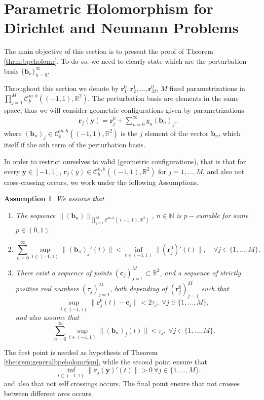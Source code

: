 \documentclass{article}
\newtheorem{assumption}[theorem]{Assumption}
\newcommand{\IN}{{\mathbb N}}
\newcommand{\IR}{{\mathbb R}}
\newcommand{\cmspaceh}[4]{\mathcal{C}^{#1,#2} \left( #3, #4 \right)}
\newcommand{\rgeoh}[2]{\mathcal{C}_b^{#1,#2}\left( (-1,1), \IR^2 \right)}
\newcommand{\bc}{\bm{c}}
\newcommand{\br}{\bm{r}}
\newcommand{\by}{\bm{y}}
\newcommand{\bb}{\bm{b}}
\begin{document}
\section{Parametric Holomorphism for Dirichlet and Neumann Problems}
\label{sec:parametrichlmrf}
The main objective of this section is to present the proof of Theorem \ref{thrm:bpeholomr}. To do so, we need to clearly state which are the perturbation basis $\{\bb_n\}_{n=0}^\infty$.

Throughout this section we denote by 
$\br^0_1,\br^1_2,\hdots, \br^0_M$, $M$ fixed parametrizations in $\prod_{j=1}^M \rgeoh{m}{h}$.  The perturbation basis are elements in the same space, thus we will consider geometric configurations given by parametrizations 
\begin{align*}
\br_j(\by) = \br^0_j + \sum_{n=0}^\infty y_n (\bb_n)_j ,
\end{align*}
where $(\bb_n)_j \in \rgeoh{m}{h}$ is the $j$ element of the vector $\bb_n$, which itself if the $n$th term of the perturbation basis.

In order to restrict ourselves to valid (geometric configurations), that is that for every $\by \in [-1,1]$, $\br_j(y) \in \rgeoh{n}{h}$ for $j=1,\hdots,M$, and also not cross-crossing occurs, we work under the following Assumptions. 
\begin{assumption}
\label{assump:geoparam}
We assume that
\begin{enumerate}
\item 
The sequence $\|(\bb_n)\|_{\prod_{j=1}^M\cmspaceh{m}{h}{(-1,1)}{\IR^2}}$, $n\in \IN$ is $p-$sumable for some $p \in (0,1)$.
\item 
$$\sum_{n=0}^\infty \sup_{t \in (-1,1)} \| ( \bb_n)_j'(t)\| < \inf_{t \in (-1,1)}\|(\br^0_j)'(t)\|,\quad \forall
j \in \{1,\hdots,M\}.
$$
\item
There exist a sequence of points $(\bc_j)_{j=1}^M \subset \IR^2$, and a sequence of strictly positive real numbers $(\tau_j)_{j=1}^M $, both depending of $(\br_j^0)_{j=1}^M$ such that 
$$\sup_{t\in(-1,1)} \| \br^0_j(t) - \bc_j \| < 2\tau_j,\ \forall j \in \{1,\hdots,M\},$$
and also assume that 
$$
\sum_{n=0}^\infty \sup_{t \in (-1,1)} \| (\bb_n)_j(t)\| <  \tau_j,\ \forall j \in \{1,\hdots,M\}.
$$
\end{enumerate}
\end{assumption}
The first point is needed as hypothesis of Theorem \ref{theorem:generalbpeholomrfsm}, while the second point  ensure that 
$$
\inf_{t \in (-1,1)} \| \br_j(\by)'(t) \| > 0 \ \forall j \in \{1,\hdots,M\}.
$$
and also that not self crossings occurs. The final point ensure that not crosses between different arcs occurs.
\end{document}
